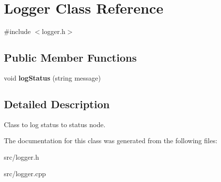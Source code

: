 \hypertarget{classLogger}{\section{Logger Class Reference}
\label{classLogger}
}


{\ttfamily \#include $<$logger.\-h$>$}

\subsection*{Public Member Functions}
\begin{DoxyCompactItemize}
\item 
\hypertarget{classLogger_a01b37cb598485659cbe4dc0769fe066f}{void {\bfseries log\-Status} (string message)}\label{classLogger_a01b37cb598485659cbe4dc0769fe066f}

\end{DoxyCompactItemize}


\subsection{Detailed Description}
Class to log status to status node. 

The documentation for this class was generated from the following files\-:\begin{DoxyCompactItemize}
\item 
src/logger.\-h\item 
src/logger.\-cpp\end{DoxyCompactItemize}
